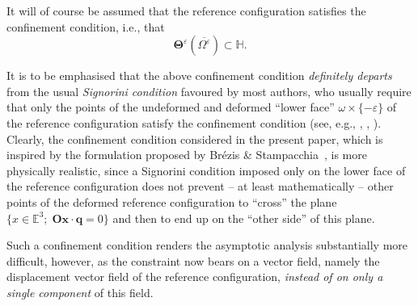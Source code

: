 \documentclass{amsart}
\begin{document}
It will of course be assumed that the reference configuration satisfies the confinement condition, i.e., that
$$
\bm{\Theta}^\varepsilon(\overline{\Omega^\varepsilon}) \subset \mathbb{H}.
$$

It is to be emphasised that the above confinement condition \emph{definitely departs} from the usual \emph{Signorini condition} favoured by most authors, who usually require that only the points of the undeformed and deformed ``lower face'' $\omega \times \{-\varepsilon\}$ of the reference configuration satisfy the confinement condition (see, e.g., \cite{LegMia2008}, \cite{LegMia2018}, \cite{Rodri2018}). Clearly, the confinement condition considered in the present paper, which is inspired by the formulation proposed by Br\'ezis \& Stampacchia~\cite{BrezisStampacchia1968}, is more physically realistic, since a Signorini condition imposed only on the lower face of the reference configuration does not prevent -- at least mathematically -- other points of the deformed reference configuration to ``cross'' the plane  $\{x \in \mathbb{E}^3; \; \bm{Ox} \cdot \bm{q} = 0\}$ and then to end up on the ``other side'' of this plane.

Such a confinement condition renders the asymptotic analysis substantially more difficult, however, as the constraint now bears on a vector field, namely the displacement vector field of the reference configuration, \emph{instead of on only a single component} of this field.
\end{document}
